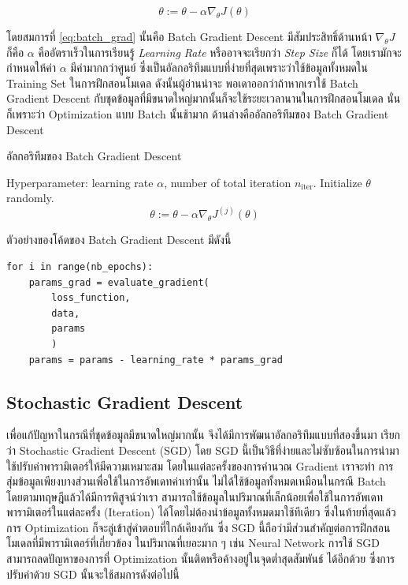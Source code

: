 \begin{equation}\label{eq:batch_grad}
    \theta := \theta - \alpha\nabla_\theta J(\theta)
\end{equation}

\noindent โดยสมการที่ \ref{eq:batch_grad} นั้นคือ Batch Gradient Descent มีสัมประสิทธิ์ด้านหน้า $\nabla_\theta J$ ก็คือ 
$\alpha$ คืออัตราเร็วในการเรียนรู้ \textit{Learning Rate} หรืออาจจะเรียกว่า \textit{Step Size} ก็ได้ โดยเรามักจะกำหนดให้ค่า 
$\alpha$ มีค่ามากกว่าศูนย์ ซึ่งเป็นอัลกอริทึมแบบที่ง่ายที่สุดเพราะว่าใช้ข้อมูลทั้งหมดใน Training Set ในการฝึกสอนโมเดล ดังนั้นผู้อ่านน่าจะ%
พอเดาออกว่าถ้าหากเราใช้ Batch Gradient Descent กับชุดข้อมูลที่มีขนาดใหญ่มากนั้นก็จะใช้ระยะเวลานานในการฝึกสอนโมเดล นั่นก็เพราะว่า 
Optimization แบบ Batch นั้นช้ามาก ด้านล่างคืออัลกอริทึมของ Batch Gradient Descent

\begin{algorithm}[H]
    \caption{อัลกอริทึมของ Batch Gradient Descent}
    \label{alg:batch_grad}
    \begin{algorithmic}
    \State Hyperparameter: learning rate $\alpha$, number of total iteration $n_\text{iter}$.
    \State Initialize $\theta$ randomly.
        \begin{equation*}
            \theta := \theta - \alpha\nabla_\theta J^{(j)}(\theta)
        \end{equation*}
    \EndFor
    \end{algorithmic}
\end{algorithm}

\noindent ตัวอย่างของโค้ดของ Batch Gradient Descent มีดังนี้

\begin{lstlisting}[style=MyPython]
for i in range(nb_epochs):
    params_grad = evaluate_gradient(
        loss_function, 
        data, 
        params
        )
    params = params - learning_rate * params_grad
\end{lstlisting}

\subsection{Stochastic Gradient Descent}
\label{ssec:stochastic_grad}

เพื่อแก้ปัญหาในกรณีที่ชุดข้อมูลมีขนาดใหญ่มากนั้น จึงได้มีการพัฒนาอัลกอริทึมแบบที่สองขึ้นมา เรียกว่า Stochastic Gradient Descent (SGD) 
โดย SGD นี้เป็นวิธีที่ง่ายและไม่ซับซ้อนในการนำมาใช้ปรับค่าพารามิเตอร์ให้มีความเหมาะสม โดยในแต่ละครั้งของการคำนวณ Gradient เราจะทำ%
การสุ่มข้อมูลเพียงบางส่วนเพื่อใช้ในการอัพเดทค่าเท่านั้น ไม่ได้ใช้ข้อมูลทั้งหมดเหมือนในกรณี Batch โดยตามทฤษฎีแล้วได้มีการพิสูจน์ว่าเรา%
สามารถใช้ข้อมูลในปริมาณที่เล็กน้อยเพื่อใช้ในการอัพเดทพารามิเตอร์ในแต่ละครั้ง (Iteration) ได้โดยไม่ต้องนำข้อมูลทั้งหมดมาใช้ทีเดียว 
ซึ่งในท้ายที่สุดแล้วการ Optimization ก็จะลู่เข้าสู่คำตอบที่ใกล้เคียงกัน ซึ่ง SGD นี้ถือว่ามีส่วนสำคัญต่อการฝึกสอนโมเดลที่มีพารามิเตอร์ที่เกี่ยวข้อง%
ในปริมาณที่เยอะมาก ๆ เช่น Neural Network การใช้ SGD สามารถลดปัญหาของการที่ Optimization นั้นติดหรือค้างอยู่ในจุดต่ำสุดสัมพันธ์%
ได้อีกด้วย ซึ่งการปรับค่าด้วย SGD นั้นจะใช้สมการดังต่อไปนี้

